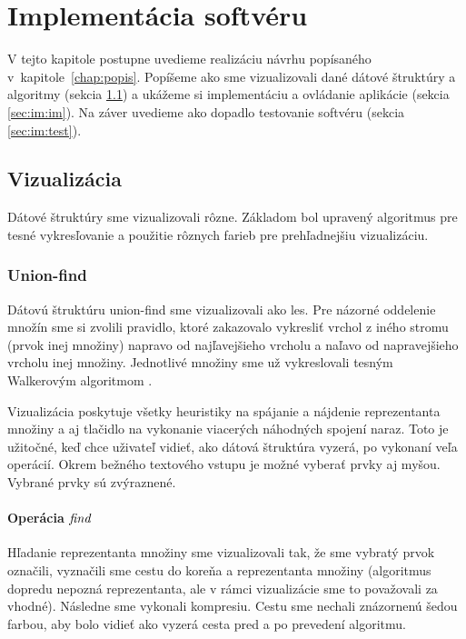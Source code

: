\chapter{Implementácia softvéru}\label{chap:implementacia}

V tejto kapitole postupne uvedieme realizáciu návrhu popísaného 
v~kapitole~\ref{chap:popis}. Popíšeme ako sme vizualizovali dané 
dátové štruktúry a algoritmy (sekcia \ref{sec:im:vis}) a ukážeme si 
implementáciu a ovládanie aplikácie (sekcia \ref{sec:im:im}). 
Na záver uvedieme ako dopadlo testovanie softvéru (sekcia \ref{sec:im:test}).

\section{Vizualizácia}\label{sec:im:vis}

Dátové štruktúry sme vizualizovali rôzne. Základom bol upravený algoritmus pre 
tesné vykresľovanie a použitie rôznych farieb pre prehľadnejšiu vizualizáciu.

\subsection{Union-find}

Dátovú štruktúru union-find sme vizualizovali ako les. Pre názorné 
oddelenie množín sme si zvolili pravidlo, ktoré zakazovalo vykresliť vrchol 
z iného stromu (prvok inej množiny) 
napravo od najľavejšieho vrcholu a naľavo od napravejšieho vrcholu inej 
množiny. Jednotlivé množiny sme už vykreslovali tesným Walkerovým algoritmom 
\citep{walker}. 

Vizualizácia poskytuje všetky heuristiky na spájanie a 
nájdenie reprezentanta množiny a 
aj tlačidlo na vykonanie viacerých náhodných spojení naraz. Toto je užitočné, 
keď chce uživateľ vidieť, ako dátová štruktúra vyzerá, po vykonaní 
veľa operácií. Okrem bežného textového vstupu je možné vyberať prvky aj myšou. 
Vybrané prvky sú zvýraznené.

\subsubsection{Operácia $\mathop{\mathit{find}}$}

Hľadanie reprezentanta množiny sme vizualizovali tak, že sme vybratý prvok 
označili, vyznačili sme cestu do koreňa a reprezentanta množiny 
(algoritmus dopredu nepozná reprezentanta, ale v rámci vizualizácie sme to 
považovali za vhodné). Následne sme vykonali kompresiu. Cestu sme nechali 
znázornenú šedou farbou, aby bolo vidieť ako vyzerá cesta pred a po prevedení 
algoritmu. 

